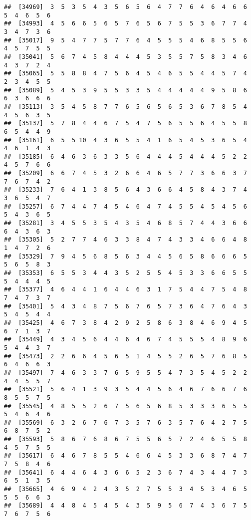 \documentclass[
]{book}
\begin{document}
\begin{verbatim}
##  [34969]  3  5  3  5  4  3  5  6  5  6  4  7  7  6  4  6  4  6  6  5  4  6  5  6
##  [34993]  4  5  6  6  5  6  5  7  6  5  6  7  5  5  3  6  7  7  4  3  4  7  3  6
##  [35017]  9  5  4  7  7  5  7  7  6  4  5  5  5  4  6  8  5  5  6  4  5  7  5  5
##  [35041]  5  6  7  4  5  8  4  4  4  5  3  5  5  7  5  8  3  4  6  4  3  7  2  4
##  [35065]  5  5  8  8  4  7  5  6  4  5  4  6  5  5  4  4  5  7  4  2  3  4  5  5
##  [35089]  5  4  5  3  9  5  5  3  3  5  4  4  4  4  4  9  5  8  6  6  3  6  6  6
##  [35113]  3  5  4  5  8  7  7  6  5  6  5  6  5  3  6  7  8  5  4  4  5  6  3  5
##  [35137]  5  7  8  4  4  6  7  5  4  7  5  6  5  5  6  4  5  5  8  6  5  4  4  9
##  [35161]  6  5  5 10  4  3  6  5  5  4  1  6  5  4  5  3  6  5  4  4  6  1  4  3
##  [35185]  6  4  6  3  6  3  3  5  6  4  4  4  5  4  4  4  5  2  2  4  5  7  6  6
##  [35209]  6  6  7  4  5  3  2  6  6  4  6  5  7  7  3  6  6  3  7  7  6  7  4  2
##  [35233]  7  6  4  1  3  8  5  6  4  3  6  6  4  5  8  4  3  7  4  3  6  5  4  7
##  [35257]  6  7  4  4  7  4  5  4  6  4  7  4  5  5  4  5  4  5  6  5  4  3  6  5
##  [35281]  3  4  5  5  3  5  4  3  5  4  6  8  5  7  4  4  3  6  6  6  4  3  6  3
##  [35305]  5  2  7  7  4  6  3  3  8  4  7  4  3  3  4  6  6  4  8  1  4  7  2  6
##  [35329]  7  9  4  5  6  8  5  6  3  4  4  5  6  5  8  6  6  6  5  5  6  5  8  3
##  [35353]  6  5  5  3  4  4  3  5  2  5  5  4  5  3  3  6  6  5  5  5  4  4  4  5
##  [35377]  4  6  4  4  1  6  4  4  6  3  1  7  5  4  4  7  5  4  8  7  4  7  3  7
##  [35401]  5  4  3  4  8  7  5  6  7  6  5  7  3  6  4  7  6  4  3  5  4  5  4  4
##  [35425]  4  6  7  3  8  4  2  9  2  5  8  6  3  8  4  6  9  4  5  6  7  1  3  7
##  [35449]  4  3  4  5  6  4  4  6  4  6  7  4  5  5  5  4  8  9  6  5  4  4  3  7
##  [35473]  2  2  6  6  4  5  6  5  1  4  5  5  2  6  5  7  6  8  5  6  4  6  6  3
##  [35497]  7  4  6  3  3  7  6  5  9  5  5  4  7  3  5  4  5  2  2  4  4  5  5  7
##  [35521]  5  6  4  1  3  9  3  5  4  4  5  6  4  6  7  6  6  7  6  8  5  5  7  5
##  [35545]  4  8  5  5  2  6  7  5  6  5  6  8  5  3  3  3  6  5  5  5  4  6  4  6
##  [35569]  6  3  2  6  7  6  7  3  5  7  6  3  5  7  6  4  2  7  5  6  8  7  5  2
##  [35593]  5  8  6  7  6  8  6  7  5  5  6  5  7  2  4  6  5  5  8  4  5  7  5  5
##  [35617]  6  4  6  7  8  5  5  4  6  6  4  5  3  3  6  8  7  4  7  7  5  8  4  6
##  [35641]  6  4  4  6  4  3  6  6  5  2  3  6  7  4  3  4  4  7  3  6  5  1  3  5
##  [35665]  4  6  9  4  2  4  3  5  2  7  5  5  3  4  5  3  4  6  5  5  5  6  6  3
##  [35689]  4  4  8  4  5  4  5  4  3  5  9  5  6  7  4  3  6  7  5  7  6  7  5  6

\end{verbatim}
\end{document}
